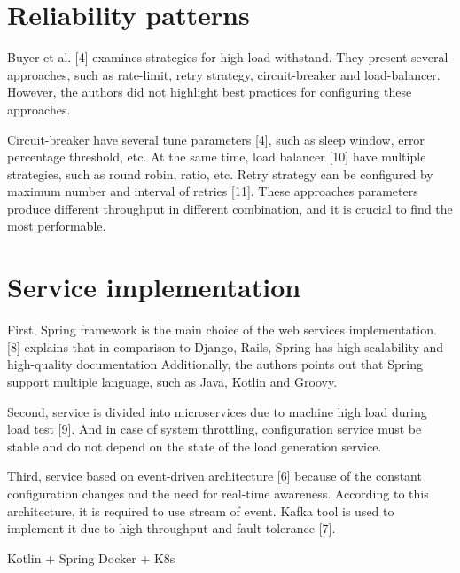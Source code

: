\section{Reliability patterns}\label{sec:reliablity}

Buyer et al. [4] examines strategies for high load withstand.
They present several approaches, such as rate-limit, retry strategy,
circuit-breaker and load-balancer.
However, the authors did not highlight best practices for configuring these approaches.

Circuit-breaker have several tune parameters [4], such as
sleep window, error percentage threshold, etc.
At the same time, load balancer [10] have multiple strategies, such as round robin, ratio, etc.
Retry strategy can be configured by maximum number and interval of retries [11].
These approaches parameters produce different throughput in different combination, and it is crucial to
find the most performable.

\section{Service implementation}\label{sec:implementation}
First, Spring framework is the main choice of the web services implementation.
[8] explains that in comparison to Django, Rails, Spring has high scalability and high-quality documentation
Additionally, the authors points out that Spring support multiple language, such as Java, Kotlin and Groovy.


Second, service is divided into microservices due to machine high load during load test [9].
And in case of system throttling, configuration service must be stable and do not depend on the
state of the load generation service.

Third, service based on event-driven architecture [6] because of the constant configuration changes
and the need for real-time awareness.
According to this architecture, it is required to use stream of event.
Kafka tool is used to implement it due to high throughput and fault tolerance [7].

Kotlin + Spring
Docker + K8s